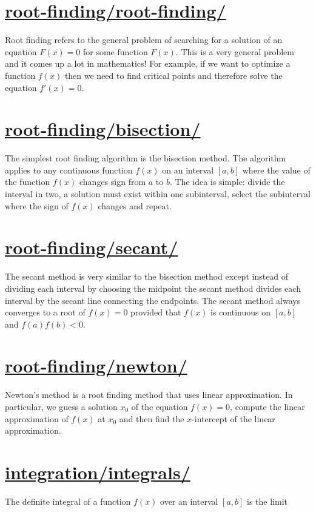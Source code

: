 \documentclass[12pt]{article}
\begin{document}
\section{\href{https://patrickwalls.github.io/mathematicalpython/root-finding/root-finding/}{root-finding/root-finding/}}
Root finding refers to the general problem of searching for a solution of an equation $F(x)=0$ for some function $F(x)$. This is a very general problem and it comes up a lot in mathematics! For example, if we want to optimize a function $f(x)$ then we need to find critical points and therefore solve the equation $f'(x)=0$.
\vspace{1cm}
\section{\href{https://patrickwalls.github.io/mathematicalpython/root-finding/bisection/}{root-finding/bisection/}}
The simplest root finding algorithm is the bisection method. The algorithm applies to any continuous function $f(x)$ on an interval $[a,b]$ where the value of the function $f(x)$ changes sign from $a$ to $b$. The idea is simple: divide the interval in two, a solution must exist within one subinterval, select the subinterval where the sign of $f(x)$ changes and repeat.
\vspace{1cm}
\section{\href{https://patrickwalls.github.io/mathematicalpython/root-finding/secant/}{root-finding/secant/}}
The secant method is very similar to the bisection method except instead of dividing each interval by choosing the midpoint the secant method divides each interval by the secant line connecting the endpoints. The secant method always converges to a root of $f(x)=0$ provided that $f(x)$ is continuous on $[a,b]$ and $f(a)f(b)<0$.
\vspace{1cm}
\section{\href{https://patrickwalls.github.io/mathematicalpython/root-finding/newton/}{root-finding/newton/}}
Newton's method is a root finding method that uses linear approximation. In particular, we guess a solution $x_0$ of the equation $f(x)=0$, compute the linear approximation of $f(x)$ at $x_0$ and then find the $x$-intercept of the linear approximation.
\vspace{1cm}
\section{\href{https://patrickwalls.github.io/mathematicalpython/integration/integrals/}{integration/integrals/}}
The definite integral of a function $f(x)$ over an interval $[a,b]$ is the limit
\vspace{1cm}
\end{document}
